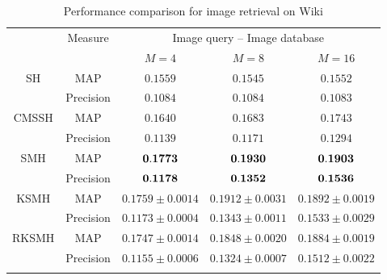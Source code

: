 \begin{table}[htb]\small
\caption{Performance comparison for image retrieval on \mbox{Wiki}}\label{table:comp-wiki-uni-ii}\vspace{-0.5cm}
\begin{center}
\begin{tabular}{|c|c|c|c|c|}
\toprule[1pt]\addlinespace[0pt]
    \multirow{2}{*}{Method}&  \multirow{2}{*}{Measure}  &  \multicolumn{3}{|c|}{Image query -- Image database}  \\
\cline{3-5}%
&&$M=4$&$M=8$&$M=16$\\
\hline
\multirow{2}{*}{SH}&{MAP}    & $0.1559$   &  $0.1545$&$ 0.1552 $ \\
\cline{2-5}%
&{Precision}    &      $0.1084$         &        $0.1084$      &  $ 0.1083 $\\
\hline %
\multirow{2}{*}{CMSSH}&{MAP}    &    $0.1640  $           &  $    0.1683   $ &$ 0.1743$  \\
\cline{2-5}%
&{Precision}    &     	$0.1139  $         &     $    0.1171   $         &        $  0.1294 $       \\
\hline%
\multirow{2}{*}{SMH}&MAP        &     ${\bf 0.1773}  $         &     $  {\bf 0.1930} $      &  $  {\bf 0.1903}$ \\
\cline{2-5}%
&{Precision}    &     	$ {\bf 0.1178}  $         &   $ {\bf 0.1352}  $            &    $  {\bf 0.1536}$         \\
\hline%
\multirow{2}{*}{KSMH}&MAP        &   $0.1759        \pm 0.0014    $       &  $0.1912\pm 0.0031 $         & $0.1892\pm   0.0019$ \\
\cline{2-5}%
&{Precision}    &     	$0.1173  \pm0.0004  $         & $  0.1343 \pm  0.0011  $              &  $   0.1533\pm   0.0029$       \\
\hline%
\multirow{2}{*}{RKSMH}&MAP        &     $0.1747        \pm0.0014       $         & $0.1848\pm 0.0020$          & $0.1884\pm0.0019$  \\
\cline{2-5}%
&{Precision}    &    	$0.1155        \pm0.0006       $          &    $0.1324\pm 0.0007$           &    $0.1512\pm0.0022$         \\
\addlinespace[0pt]\bottomrule[1pt]
\end{tabular}
\end{center}
\end{table}

